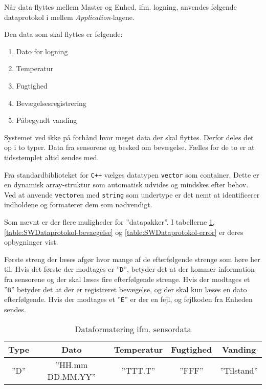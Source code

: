
Når data flyttes mellem Master og Enhed, ifm. logning, anvendes følgende dataprotokol i mellem \textit{Application}-lagene.

Den data som skal flyttes er følgende:

\begin{enumerate}
	\item Dato for logning
	\item Temperatur
	\item Fugtighed
	\item Bevægelsesregistrering
	\item Påbegyndt vanding
\end{enumerate}

Systemet ved ikke på forhånd hvor meget data der skal flyttes. Derfor deles det op i to typer. Data fra sensorene og besked om bevægelse.
Fælles for de to er at tidsstemplet altid sendes med.

Fra standardbiblioteket for \verb'C++' vælges datatypen \verb+vector+ som container. Dette er en dynamisk array-struktur som automatisk udvides og mindskes efter behov.
Ved at anvende \verb+vector+en med \verb+string+ som undertype er det nemt at identificerer indholdene og formaterer dem som nødvendigt.

Som nævnt er der flere muligheder for ''datapakker''. I tabellerne \ref{table:SWDataprotokol-sensor}, \ref{table:SWDataprotokol-bevaegelse} og \ref{table:SWDataprotokol-error} er deres opbygninger vist.

Første streng der læses afgør hvor mange af de efterfølgende strenge som høre her til. Hvis det første der modtages er ''\verb+D+'', betyder det at der kommer information fra sensorene og der skal læses fire efterfølgende strenge.
Hvis der modtages et ''\verb+B+'' betyder det at der er registreret bevægelse, og der skal kun læses en dato efterfølgende. Hvis der modtages et ''\verb+E+'' er der en fejl, og fejlkoden fra Enheden sendes.

\begin{table}[h]
	\caption{Dataformatering ifm. sensordata}
	\centering
	\begin{tabular}{|c|c|c|c|c|}
		\hline 
		\textbf{Type} & \textbf{Dato} & \textbf{Temperatur} & \textbf{Fugtighed} & \textbf{Vanding} \\ 
		\hline 
		''D'' & ''HH.mm DD.MM.YY'' & ''TTT.T'' & ''FFF'' & ''Tilstand'' \\ 
		\hline 
	\end{tabular} 
	\label{table:SWDataprotokol-sensor}
\end{table}

